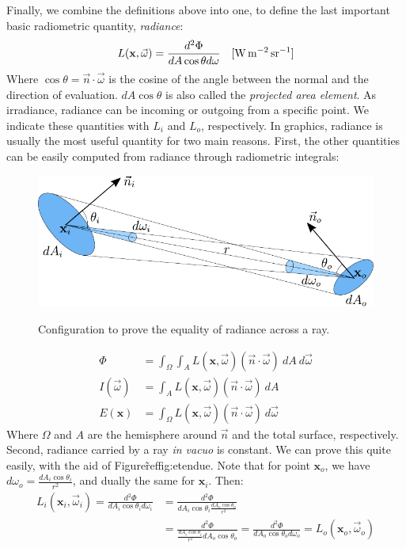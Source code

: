Finally, we combine the definitions above into one, to define the last important basic radiometric quantity, \emph{radiance}:
$$
L(\mathbf{x}, \vec{\omega}) = \frac{d^2 \Phi}{d A \cos\theta d \omega}  \siunit{\watt \per \square \metre \per \steradian}
$$
Where $\cos \theta = \vec{n} \cdot \vec{\omega}$ is the cosine of the angle between the normal and the direction of evaluation. $d A \cos\theta$ is also called the \emph{projected area element}. As irradiance, radiance can be incoming or outgoing from a specific point. We indicate these quantities with $L_i$ and $L_o$, respectively. In graphics, radiance is usually the most useful quantity for two main reasons. First, the other quantities can be easily computed from radiance through radiometric integrals:
\begin{figure}
\centering
	 \includegraphics[scale=0.8]{figures/etendue}  \\
\caption{Configuration to prove the equality of radiance across a ray.} %
\label{fig:etendue}
\end{figure}
\begin{equation*}
\begin{split}
\Phi &= \int_{\Omega} \int_{A} L(\mathbf{x}, \vec{\omega})  (\vec{n} \cdot \vec{\omega}) \ dA \ d \vec{\omega} \\
I(\vec{\omega}) &= \int_{A} L(\mathbf{x}, \vec{\omega})  (\vec{n} \cdot \vec{\omega}) \ dA  \\
E(\mathbf{x}) &= \int_{\Omega} L(\mathbf{x}, \vec{\omega})  (\vec{n} \cdot \vec{\omega}) \ d \vec{\omega} 
\end{split}
\end{equation*}
Where $\Omega$ and $A$ are the hemisphere around $\vec{n}$ and the total surface, respectively. Second, radiance carried by a ray \emph{in vacuo} is constant. We can prove this quite easily, with the aid of Figure\~ref{fig:etendue}. Note that for point $\mathbf{x}_o$, we have $d \omega_o = \frac{d A_i \cos\theta_i}{r^2}$, and dually the same for $\mathbf{x}_i$. Then:
\begin{equation*}
\begin{split}
L_i(\mathbf{x}_i, \vec{\omega}_i) = \frac{d^2 \Phi}{d A_i \cos\theta_i d \omega_i} &= 
\frac{d^2 \Phi}{d A_i \cos\theta_i \frac{d A_o \cos\theta_o}{r^2}}  
\\ &= \frac{d^2 \Phi}{\frac{d A_i \cos\theta_i}{r^2} d A_o \cos\theta_o } 
= \frac{d^2 \Phi}{d A_o \cos\theta_o d \omega_o} = L_o(\mathbf{x}_o, \vec{\omega}_o)
\end{split}
\end{equation*}

